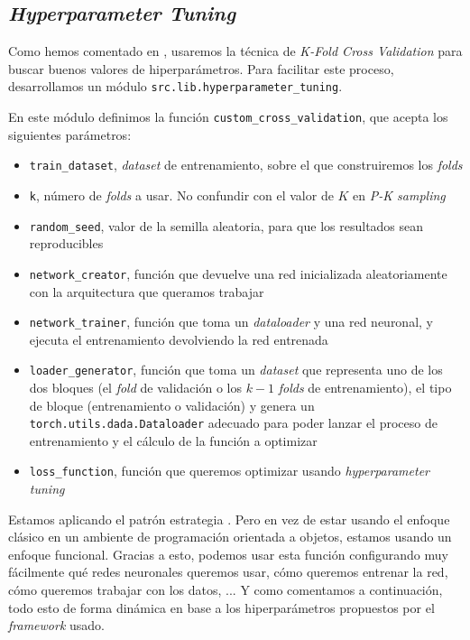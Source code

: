 \subsection{\textit{Hyperparameter Tuning}} \label{isec:hp_tuning}

Como hemos comentado en , usaremos la técnica de \textit{K-Fold Cross Validation} para buscar buenos valores de hiperparámetros. Para facilitar este proceso, desarrollamos un módulo \lstinline{src.lib.hyperparameter_tuning}.

En este módulo definimos la función \lstinline{custom_cross_validation}, que acepta los siguientes parámetros:

\begin{itemize}
    \item \lstinline{train_dataset}, \textit{dataset} de entrenamiento, sobre el que construiremos los \textit{folds}
    \item \lstinline{k}, número de \textit{folds} a usar. No confundir con el valor de $K$ en \textit{P-K sampling}
    \item \lstinline{random_seed}, valor de la semilla aleatoria, para que los resultados sean reproducibles
    \item \lstinline{network_creator}, función que devuelve una red inicializada aleatoriamente con la arquitectura que queramos trabajar
    \item \lstinline{network_trainer}, función que toma un \textit{dataloader} y una red neuronal, y ejecuta el entrenamiento devolviendo la red entrenada
    \item \lstinline{loader_generator}, función que toma un \textit{dataset} que representa uno de los dos bloques (el \textit{fold} de validación o los $k-1$ \textit{folds} de entrenamiento), el tipo de bloque (entrenamiento o validación) y genera un \lstinline{torch.utils.dada.Dataloader} adecuado para poder lanzar el proceso de entrenamiento y el cálculo de la función a optimizar
    \item \lstinline{loss_function}, función que queremos optimizar usando \textit{hyperparameter tuning}
\end{itemize}

Estamos aplicando el patrón estrategia \cite{informatica:design_patterns} \cite{informatica:strategy_pattern_web}. Pero en vez de estar usando el enfoque clásico en un ambiente de programación orientada a objetos, estamos usando un enfoque funcional. Gracias a esto, podemos usar esta función configurando muy fácilmente qué redes neuronales queremos usar, cómo queremos entrenar la red, cómo queremos trabajar con los datos, ... Y como comentamos a continuación, todo esto de forma dinámica en base a los hiperparámetros propuestos por el \textit{framework} usado.

